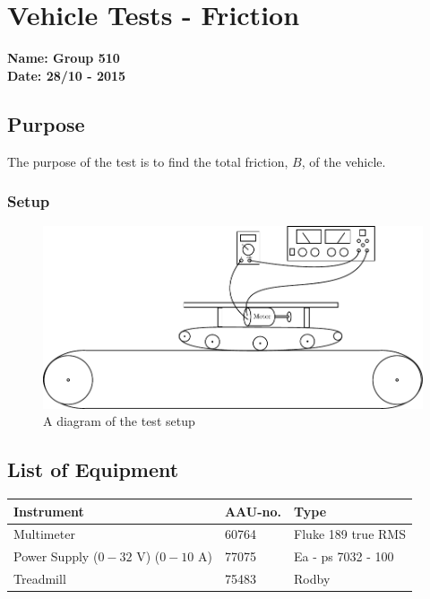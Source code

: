 \pagebreak
\section{Vehicle Tests - Friction} \label{app:frictionTest}
\textbf{Name: Group 510}\\
\textbf{Date: 28/10 - 2015}

\subsection{Purpose}
The purpose of the test is to find the total friction, $B$, of the vehicle.
\subsubsection{Setup}
\begin{figure}[H]
  \centering
	\includegraphics[scale=1]{figures/frictionTestSetup.pdf}
	\caption{A diagram of the test setup}
\end{figure}\vspace{-5mm}

\subsection{List of Equipment}

\begin{table}[H]
\begin{tabular}{|l|l|p{4cm}|}
\hline%
  \textbf{Instrument}                       &  \textbf{AAU-no.}  &  \textbf{Type}         \\
\hline%
  Multimeter                                &  60764             &  Fluke 189 true RMS    \\
\hline%
  Power Supply ($0 - 32$ V) ($0 - 10$ A)    &  77075             &  Ea - ps 7032 - 100    \\
\hline%
  Treadmill                                 &  75483             &  Rodby                 \\
\hline%
\end{tabular}
\end{table}

